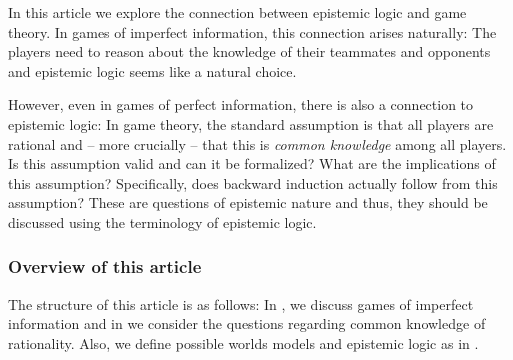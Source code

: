 In this article we explore the connection between epistemic logic and game theory. In games of imperfect information, this connection arises naturally: The players need to reason about the knowledge of their teammates and opponents and epistemic logic seems like a natural choice.

However, even in games of perfect information, there is also a connection to epistemic logic: In game theory, the standard assumption is that all players are rational and -- more crucially -- that this is \emph{common knowledge} among all players. Is this assumption valid and can it be formalized? What are the implications of this assumption? Specifically, does backward induction actually follow from this assumption? These are questions of epistemic nature and thus, they should be discussed using the terminology of epistemic logic.

\subsubsection*{Overview of this article}

The structure of this article is as follows: In , we discuss games of imperfect information and in  we consider the questions regarding common knowledge of rationality. Also, we define possible worlds models and epistemic logic as in \cite{fagin1995a}.